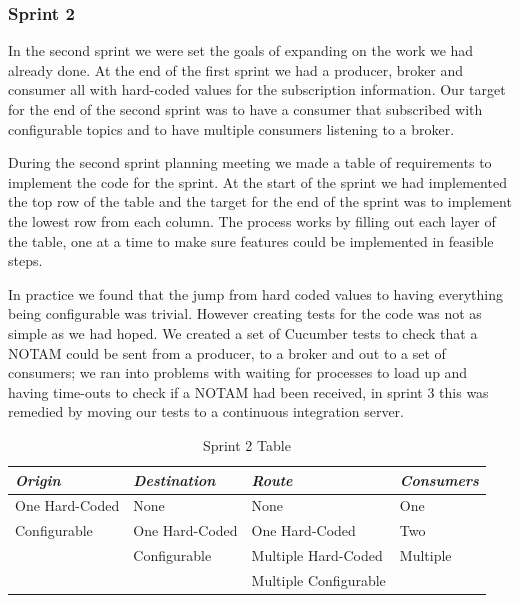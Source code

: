 \documentclass[a4paper, 12pt]{article}
\begin{document}
\subsubsection{Sprint 2}

In the second sprint we were set the goals of expanding on the work we had already done. At the end of the first sprint we had a producer, broker and consumer all with hard-coded values for the subscription information. Our target for the end of the second sprint was to have a consumer that subscribed with configurable topics and to have multiple consumers listening to a broker.

During the second sprint planning meeting we made a table of requirements to implement the code for the sprint. At the start of the sprint we had implemented the top row of the table and the target for the end of the sprint was to implement the lowest row from each column. The process works by filling out each layer of the table, one at a time to make sure features could be implemented in feasible steps.

In practice we found that the jump from hard coded values to having everything being configurable was trivial. However creating tests for the code was not as simple as we had hoped. We created a set of Cucumber tests to check that a NOTAM could be sent from a producer, to a broker and out to a set of consumers; we ran into problems with waiting for processes to load up and having time-outs to check if a NOTAM had been received, in sprint 3 this was remedied by moving our tests to a continuous integration server.

\begin{table}
    \begin{tabular}{|l|l|l|l|}
    \hline
    \emph{Origin}         & \emph{Destination}    & \emph{Route}                 & \emph{Consumers} \\ \hline
    One Hard-Coded & None           & None                  & One       \\ \hline
    Configurable   & One Hard-Coded & One Hard-Coded        & Two       \\ \hline
    ~              & Configurable   & Multiple Hard-Coded   & Multiple  \\ \hline
    ~              & ~              & Multiple Configurable & ~         \\ \hline
    \end{tabular}
\caption{Sprint 2 Table}
\label{tab:sprint2}
\end{table}
\end{document}
